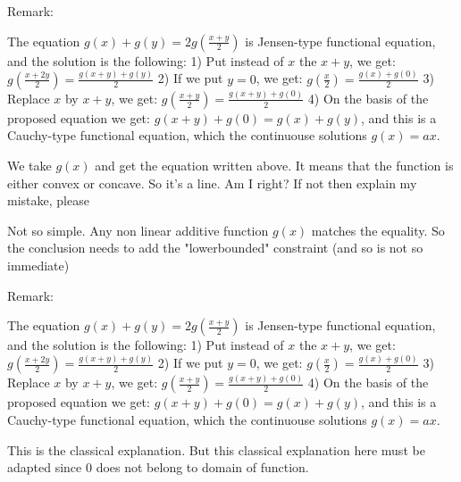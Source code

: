 \begin{solution}
	\begin{bolded}Remark:\end{bolded}
The equation  $g(x)+g(y)=2g(\frac{x+y}{2})$ is Jensen-type functional equation, and the solution is the following:
1) Put instead of $x$ the $x+y$, we get: $g\left( \frac{x+2y}{2} \right)=\frac{g(x+y)+g(y)}{2}$
2) If we put $y=0$, we get: $g\left( \frac{x}{2} \right)=\frac{g(x)+g(0)}{2}$
3) Replace $x$ by $x+y$, we get: $g\left( \frac{x+y}{2} \right)=\frac{g(x+y)+g(0)}{2}$
4) On the basis of the proposed equation we get: $g(x+y)+g(0)=g(x)+g(y)$, and this is a Cauchy-type functional equation, which the continuouse solutions $g(x)=ax$.
\end{solution}



\begin{solution}
	\begin{tcolorbox}We take $g(x)$ and get the equation written above. It means that the function is either convex or concave. So it's a line. Am I right? If not then explain my mistake, please\end{tcolorbox}
Not so simple.
Any non linear additive function $g(x)$ matches the equality. So the conclusion needs to add the "lowerbounded" constraint (and so is not so immediate)

\end{solution}



\begin{solution}
	\begin{tcolorbox}\begin{bolded}Remark:\end{bolded}
The equation  $g(x)+g(y)=2g(\frac{x+y}{2})$ is Jensen-type functional equation, and the solution is the following:
1) Put instead of $x$ the $x+y$, we get: $g\left( \frac{x+2y}{2} \right)=\frac{g(x+y)+g(y)}{2}$
2) If we put $y=0$, we get: $g\left( \frac{x}{2} \right)=\frac{g(x)+g(0)}{2}$
3) Replace $x$ by $x+y$, we get: $g\left( \frac{x+y}{2} \right)=\frac{g(x+y)+g(0)}{2}$
4) On the basis of the proposed equation we get: $g(x+y)+g(0)=g(x)+g(y)$, and this is a Cauchy-type functional equation, which the continuouse solutions $g(x)=ax$.\end{tcolorbox}

This is the classical explanation.
But this classical explanation here must be adapted since $0$ does not belong to domain of function.

\end{solution}




